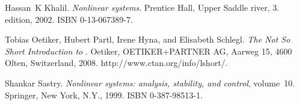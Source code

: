 \documentclass[a4paper,12pt,oneside,onecolumn]{article} %
\begin{document}
\begin{thebibliography}{99}
Hassan~K Khalil.
\newblock \emph{Nonlinear systems}.
\newblock Prentice Hall, Upper Saddle river, 3. edition, 2002.
\newblock ISBN 0-13-067389-7.

Tobias Oetiker, Hubert Partl, Irene Hyna, and Elisabeth Schlegl.
\newblock \emph{The Not So Short Introduction to \LaTeXe}.
\newblock Oetiker, OETIKER+PARTNER AG, Aarweg 15, 4600 Olten, Switzerland,
  2008.
\newblock http://www.ctan.org/info/lshort/.

Shankar Sastry.
\newblock \emph{Nonlinear systems: analysis, stability, and control},
  volume~10.
\newblock Springer, New York, N.Y., 1999.
\newblock ISBN 0-387-98513-1.
\end{thebibliography}
\end{document}
